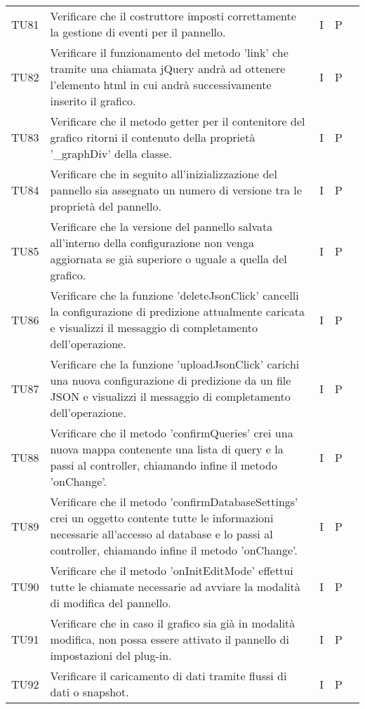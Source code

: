 \begin{longtable} {
		>{}p{15mm} 
		>{}p{79.5mm}
		>{}p{15mm} 
		>{}p{15mm}
		>{}p{0mm}}
	TU81		& Verificare che il costruttore imposti correttamente la gestione di eventi per il pannello.& I & P &\TBstrut \\ [2mm]
	TU82		& Verificare il funzionamento del metodo 'link' che tramite una chiamata jQuery andrà ad ottenere l'elemento html in cui andrà successivamente inserito il grafico.& I & P &\TBstrut \\ [2mm]
	TU83		& Verificare che il metodo getter per il contenitore del grafico ritorni il contenuto della proprietà '\_graphDiv' della classe.& I & P &\TBstrut \\ [2mm]
	TU84		& Verificare che in seguito all'inizializzazione del pannello sia assegnato un numero di versione tra le proprietà del pannello.& I & P &\TBstrut \\ [2mm]
	TU85		& Verificare che la versione del pannello salvata all'interno della configurazione non venga aggiornata se già superiore o uguale a quella del grafico.& I & P &\TBstrut \\ [2mm]
	TU86		& Verificare che la funzione 'deleteJsonClick' cancelli la configurazione di predizione attualmente caricata e visualizzi il messaggio di completamento dell'operazione.& I & P &\TBstrut \\ [2mm]
	TU87		& Verificare che la funzione 'uploadJsonClick' carichi una nuova configurazione di predizione da un file JSON e visualizzi il messaggio di completamento dell'operazione.& I & P &\TBstrut \\ [2mm]
	TU88		& Verificare che il metodo 'confirmQueries' crei una nuova mappa contenente una lista di query e la passi al controller, chiamando infine il metodo 'onChange'.& I & P &\TBstrut \\ [2mm]
	TU89		& Verificare che il metodo 'confirmDatabaseSettings' crei un oggetto contente tutte le informazioni necessarie all'accesso al database e lo passi al controller, chiamando infine il metodo 'onChange'.& I & P &\TBstrut \\ [2mm]
	TU90		& Verificare che il metodo 'onInitEditMode' effettui tutte le chiamate necessarie ad avviare la modalità di modifica del pannello.& I & P &\TBstrut \\ [2mm]
	TU91		& Verificare che in caso il grafico sia già in modalità modifica, non possa essere attivato il pannello di impostazioni del plug-in.& I & P &\TBstrut \\ [2mm]
	TU92		& Verificare il caricamento di dati tramite flussi di dati o snapshot.& I & P &\TBstrut \\ [2mm]

\end{longtable}
